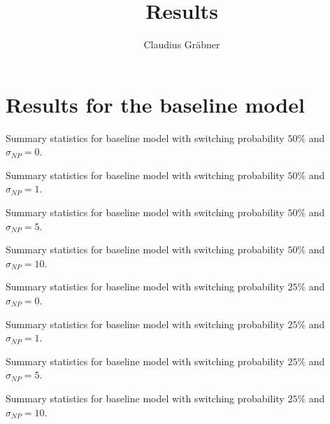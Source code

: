 \documentclass[11pt,a4paper]{article}
\author{Claudius Gr\"abner}
\title{Results}
\begin{document}
\maketitle
\section{Results for the baseline model}

\begin{table}
\begin{center}

\end{center}
\caption{Summary statistics for baseline model with switching probability $50\%$  and $\sigma_{NP}=0$.}
\end{table}
\begin{table}
\begin{center}

\end{center}
\caption{Summary statistics for baseline model with switching probability $50\%$  and $\sigma_{NP}=1$.}
\end{table}
\begin{table}
\begin{center}

\end{center}
\caption{Summary statistics for baseline model with switching probability $50\%$ and $\sigma_{NP}=5$.}
\end{table}
\begin{table}
\begin{center}

\end{center}
\caption{Summary statistics for baseline model with switching probability $50\%$ and $\sigma_{NP}=10$.}
\end{table}

\begin{table}
\begin{center}

\end{center}
\caption{Summary statistics for baseline model with switching probability $25\%$  and $\sigma_{NP}=0$.}
\end{table}
\begin{table}
\begin{center}

\end{center}
\caption{Summary statistics for baseline model with switching probability $25\%$  and $\sigma_{NP}=1$.}
\end{table}
\begin{table}
\begin{center}

\end{center}
\caption{Summary statistics for baseline model with switching probability $25\%$ and $\sigma_{NP}=5$.}
\end{table}
\begin{table}
\begin{center}

\end{center}
\caption{Summary statistics for baseline model with switching probability $25\%$ and $\sigma_{NP}=10$.}
\end{table}
\end{document}

